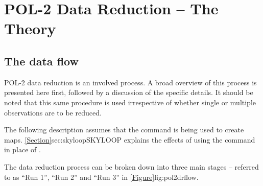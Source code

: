 \chapter{POL-2 Data Reduction -- The Theory}
\label{sec:dr}
\section{The data flow}

POL-2 data reduction is an involved process. A broad overview of this
process is presented here first, followed by a discussion of the specific
details. It should be noted that this same procedure is used irrespective
of whether single or multiple observations are to be reduced.

The following description assumes that the  command is
being used to create maps. \cref{Section}{sec:skyloop}{SKYLOOP} explains the effects
of using the  command in place of .

The data reduction process can be broken down into three main stages --
referred to as ``Run 1'', ``Run 2'' and ``Run 3'' in
\cref{Figure}{fig:pol2drflow}{}.

